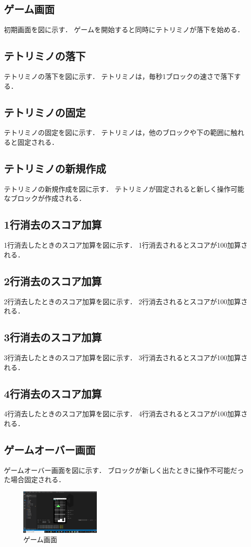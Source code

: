 \subsection{ゲーム画面}
初期画面を図に示す．
ゲームを開始すると同時にテトリミノが落下を始める．
\subsection{テトリミノの落下}
テトリミノの落下を図に示す．
テトリミノは，毎秒1ブロックの速さで落下する．
\subsection{テトリミノの固定}
テトリミノの固定を図に示す．
テトリミノは，他のブロックや下の範囲に触れると固定される．
\subsection{テトリミノの新規作成}
テトリミノの新規作成を図に示す．
テトリミノが固定されると新しく操作可能なブロックが作成される．
\subsection{1行消去のスコア加算}
1行消去したときのスコア加算を図に示す．
1行消去されるとスコアが100加算される．
\subsection{2行消去のスコア加算}
2行消去したときのスコア加算を図に示す．
2行消去されるとスコアが100加算される．
\subsection{3行消去のスコア加算}
3行消去したときのスコア加算を図に示す．
3行消去されるとスコアが100加算される．
\subsection{4行消去のスコア加算}
4行消去したときのスコア加算を図に示す．
4行消去されるとスコアが100加算される．
\subsection{ゲームオーバー画面}
ゲームオーバー画面を図に示す．
ブロックが新しく出たときに操作不可能だった場合固定される．

\begin{figure}[htb]
  \begin{center}
    \includegraphics[width=4cm,bb=0 0 1366 768]{./soft_img/10.jpg}
    \caption{ゲーム画面}
    \label{gamescreen}
  \end{center}
\end{figure}
